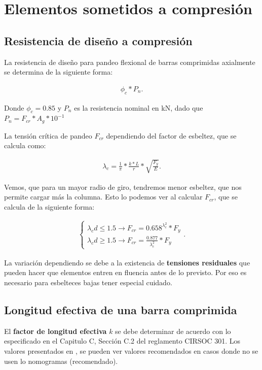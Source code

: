 \documentclass[../main.tex]{subfiles}
\begin{document}
\section{Elementos sometidos a compresión}

\subsection{Resistencia de diseño a compresión}

La resistencia de diseño para pandeo flexional de barras comprimidas axialmente
se determina de la siguiente forma:

\begin{align*}
  \phi_c * P_n
.\end{align*}

Donde $\phi_c=0.85$ y $P_n$ es la resistencia nominal en kN, dado que $P_n = F_{cr}*A_g*10^{-1}$

La tensión crítica de pandeo $F_{cr}$ dependiendo del factor de esbeltez, que 
se calcula como:

\begin{align*}
  \lambda_c = \frac{1}{\pi}*\frac{k*L}{r}*\sqrt{\frac{F_y}{E}} \tag{Esbeltez} \label{esbeltez}
.\end{align*}

Vemos, que para un mayor radio de giro, tendremos menor esbeltez, que nos permite
cargar más la columna. Esto lo podemos ver al calcular $F_{cr}$, que se calcula
de la siguiente forma:

\begin{align*}
  \begin{cases}
    \lambda_cd \leq 1.5 \rightarrow F_{cr} = 0.658^{\lambda^2_c}*F_y \\
    \lambda_cd \geq  1.5 \rightarrow F_{cr} = \frac{0.877}{\lambda^2_c}*F_y
  \end{cases}
.\end{align*}

La variación dependiendo se debe a la existencia de \textbf{tensiones residuales}
que pueden hacer que elementos entren en fluencia antes de lo previsto. Por eso
es necesario para esbelteces bajas tener especial cuidado.

\subsection{Longitud efectiva de una barra comprimida}

El \textbf{factor de longitud efectiva} $k$ se debe determinar de acuerdo con lo
especificado en el Capitulo C, Sección C.2 del reglamento CIRSOC 301. Los valores
presentados en , se pueden ver valores recomendados en 
casos donde no se usen lo nomogramas (recomendado).
\end{document}
